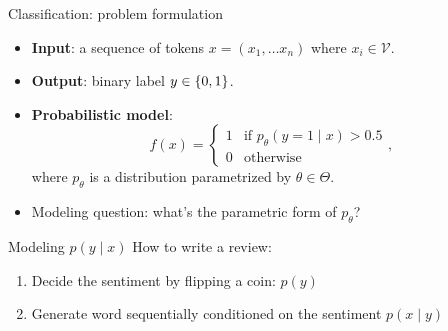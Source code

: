 \documentclass[usenames,dvipsnames,notes,11pt,aspectratio=169]{beamer}
\newcommand{\pdfnote}[1]{}
\begin{document}
\begin{frame}
    {Classification: problem formulation}
    \begin{itemize}
        \itemsep1em
        \item \textbf{Input}: a sequence of tokens $x=(x_1, \ldots x_n)$ where $x_i \in \mathcal{V}$.
        \item \textbf{Output}: binary label $y\in \left\{ 0, 1 \right\}$.
        \item \textbf{Probabilistic model}:
            $$
            f(x) = \begin{cases}
 1 & \text{if $p_\theta(y=1\mid x) > 0.5$} \\
 0 & \text{otherwise}
 \end{cases} ,
            $$
            where $p_\theta$ is a distribution parametrized by $\theta\in{\Theta}$.
        \item Modeling question: what's the parametric form of $p_\theta$?
    \end{itemize}
    \pdfnote{
        Choosing $p_\theta$ is the modeling part where our task-specific knowledge comes in: how should the label depend on the text.
    }
\end{frame}

\begin{frame}
    {Modeling $p(y\mid x)$}
    How to write a review:\\
    \pdfnote{A useful starting place for modeling is to gain some intuition on how the task is performed by humans, and then tranform that into mathematical language.}
    \begin{enumerate}
        \item Decide the sentiment by flipping a coin: $p(y)$
        \item Generate word sequentially conditioned on the sentiment  $p(x\mid y)$
    \end{enumerate}
    \pause
    \vspace{-1ex}
    \vspace{-1ex}
\end{frame}
\end{document}
